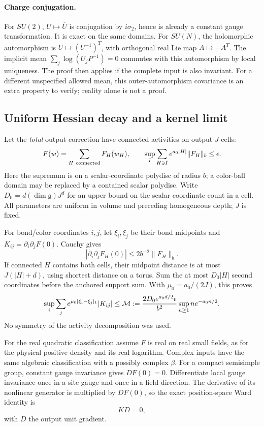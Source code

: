\paragraph{Charge conjugation.}
For \(SU(2)\), \(U\mapsto\overline U\) is conjugation by
\(i\sigma_2\), hence is already a constant gauge transformation.
It is exact on the same domains. For \(SU(N)\), the holomorphic
automorphism is \(U\mapsto(U^{-1})^T\), with orthogonal real Lie
map \(A\mapsto-A^T\). The implicit mean
\(\sum_j\log(U_jP^{-1})=0\) commutes with this automorphism
by local uniqueness. The proof then applies if the complete
input is also invariant. For a different unspecified allowed
mean, this outer-automorphism covariance is an extra property
to verify; reality alone is not a proof.

\subsection{Uniform Hessian decay and a kernel limit}
\label{msy-kernel-section}

Let the \emph{total} output correction have connected activities
on output \(J\)-cells:
\begin{equation}
 F(w)=\sum_{H\ {\rm connected}}F_H(w_H),\qquad
 \sup_I\sum_{H\ni I}e^{a_0|H|}\|F_H\|_b\le\epsilon.
 \label{msy-activity-norm}
\end{equation}
Here the supremum is on a scalar-coordinate polydisc of radius
\(b\); a color-ball domain may be replaced by a contained scalar
polydisc. Write \(D_0=d(\dim\mathfrak g)J^d\) for an upper bound
on the scalar coordinate count in a cell. All parameters are
uniform in volume and preceding homogeneous depth; \(J\) is fixed.

For bond/color coordinates \(i,j\), let \(\xi_i,\xi_j\) be their
bond midpoints and \(K_{ij}=\partial_i\partial_jF(0)\).
Cauchy gives
\[
 |\partial_i\partial_jF_H(0)|\le2b^{-2}\|F_H\|_b.
\]
If connected \(H\) contains both cells, their midpoint distance
is at most \(J(|H|+d)\), using shortest distance on a torus.
Sum the at most \(D_0|H|\) second coordinates before the
anchored support sum. With \(\mu_0=a_0/(2J)\), this proves
\begin{equation}
 \sup_i\sum_j e^{\mu_0|\xi_i-\xi_j|_1}|K_{ij}|
 \le {\cal M}:=
 \frac{2D_0e^{a_0d/2}\epsilon}{b^2}
                  \sup_{n\ge1}n e^{-a_0n/2}.
 \label{msy-exponential-row}
\end{equation}
No symmetry of the activity decomposition was used.

For the real quadratic classification assume \(F\) is real on real
small fields, as for the physical positive density and its real
logarithm. Complex inputs have the same algebraic classification
with a possibly complex \(\beta\).
For a compact semisimple group, constant gauge invariance
gives \(DF(0)=0\). Differentiate local gauge invariance once
in a site gauge and once in a field direction. The derivative
of its nonlinear generator is multiplied by \(DF(0)\), so
the exact position-space Ward identity is
\begin{equation}
 K D=0,
 \label{msy-Ward-realspace}
\end{equation}
with \(D\) the output unit gradient.

